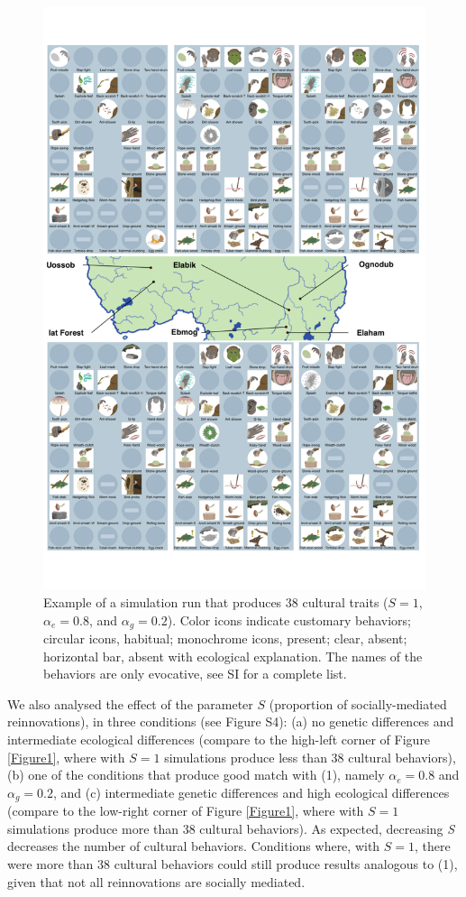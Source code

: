 \documentclass[9pt,twocolumn,twoside,]{pnas-new}
\begin{document}
\begin{figure}[h!]
\begin{center}
\includegraphics[width=11.8cm]{figures/figure_2.pdf}
\caption{Example of a simulation run that produces 38 cultural traits ($S=1$, $\alpha_e=0.8$, and $\alpha_g=0.2$). Color icons indicate customary behaviors; circular icons, habitual; monochrome icons, present; clear, absent;  horizontal bar, absent with ecological explanation. The names of the behaviors are only evocative, see SI for a complete list.}
\label{Figure2}
\end{center}
\end{figure}

We also analysed the effect of the parameter \(S\) (proportion of
socially-mediated reinnovations), in three conditions (see Figure S4):
(a) no genetic differences and intermediate ecological differences
(compare to the high-left corner of Figure \ref{Figure1}, where with
\(S=1\) simulations produce less than 38 cultural behaviors), (b) one of
the conditions that produce good match with (1), namely \(\alpha_e=0.8\)
and \(\alpha_g=0.2\), and (c) intermediate genetic differences and high
ecological differences (compare to the low-right corner of Figure
\ref{Figure1}, where with \(S=1\) simulations produce more than 38
cultural behaviors). As expected, decreasing \emph{S} decreases the
number of cultural behaviors. Conditions where, with \(S=1\), there were
more than 38 cultural behaviors could still produce results analogous to
(1), given that not all reinnovations are socially mediated.
\end{document}
